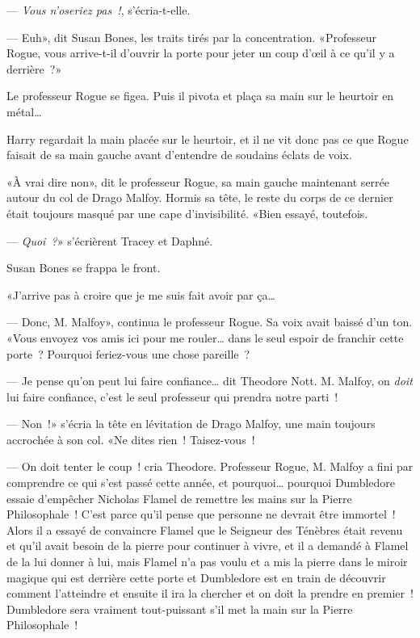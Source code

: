 --- \emph{Vous n'oseriez pas~!}, s'écria-t-elle.

--- Euh», dit Susan Bones, les traits tirés par la concentration. «Professeur Rogue, vous arrive-t-il d'ouvrir la porte pour jeter un coup d'œil à ce qu'il y a derrière~?»

Le professeur Rogue se figea. Puis il pivota et plaça sa main sur le heurtoir en métal…

Harry regardait la main placée sur le heurtoir, et il ne vit donc pas ce que Rogue faisait de sa main gauche avant d'entendre de soudains éclats de voix.

«À vrai dire non», dit le professeur Rogue, sa main gauche maintenant serrée autour du col de Drago Malfoy. Hormis sa tête, le reste du corps de ce dernier était toujours masqué par une cape d'invisibilité. «Bien essayé, toutefois.

--- \emph{Quoi~?}» s'écrièrent Tracey et Daphné.

Susan Bones se frappa le front.

«J'arrive pas à croire que je me suis fait avoir par ça…

--- Donc, M. Malfoy», continua le professeur Rogue. Sa voix avait baissé d'un ton. «Vous envoyez vos amis ici pour me rouler… dans le seul espoir de franchir cette porte~? Pourquoi feriez-vous une chose pareille~?

--- Je pense qu'on peut lui faire confiance… dit Theodore Nott. M. Malfoy, on \emph{doit} lui faire confiance, c'est le seul professeur qui prendra notre parti~!

--- Non~!» s'écria la tête en lévitation de Drago Malfoy, une main toujours accrochée à son col. «Ne dites rien~! Taisez-vous~!

--- On doit tenter le coup~! cria Theodore. Professeur Rogue, M. Malfoy a fini par comprendre ce qui s'est passé cette année, et pourquoi… pourquoi Dumbledore essaie d'empêcher Nicholas Flamel de remettre les mains sur la Pierre Philosophale~! C'est parce qu'il pense que personne ne devrait être immortel~! Alors il a essayé de convaincre Flamel que le Seigneur des Ténèbres était revenu et qu'il avait besoin de la pierre pour continuer à vivre, et il a demandé à Flamel de la lui donner à lui, mais Flamel n'a pas voulu et a mis la pierre dans le miroir magique qui est derrière cette porte et Dumbledore est en train de découvrir comment l'atteindre et ensuite il ira la chercher et on doit la prendre en premier~! Dumbledore sera vraiment tout-puissant s'il met la main sur la Pierre Philosophale~!


